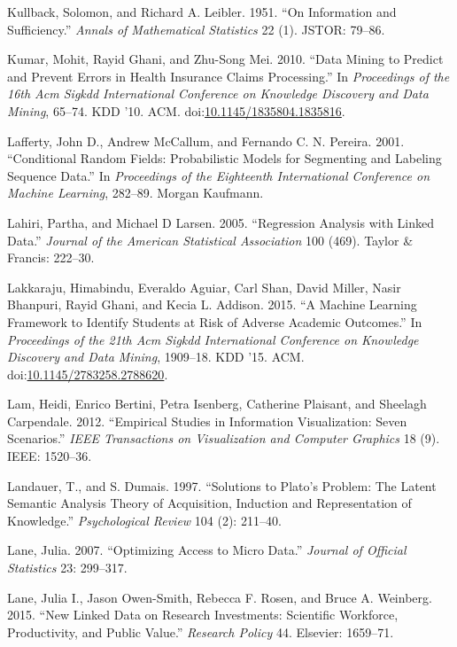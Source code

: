 \documentclass[]{krantz}
\begin{document}
\hypertarget{ref-kullback1951information}{}
Kullback, Solomon, and Richard A. Leibler. 1951. ``On Information and
Sufficiency.'' \emph{Annals of Mathematical Statistics} 22 (1). JSTOR:
79--86.

\hypertarget{ref-Kumar2010}{}
Kumar, Mohit, Rayid Ghani, and Zhu-Song Mei. 2010. ``Data Mining to
Predict and Prevent Errors in Health Insurance Claims Processing.'' In
\emph{Proceedings of the 16th Acm Sigkdd International Conference on
Knowledge Discovery and Data Mining}, 65--74. KDD '10. ACM.
doi:\href{https://doi.org/10.1145/1835804.1835816}{10.1145/1835804.1835816}.

\hypertarget{ref-lafferty-01}{}
Lafferty, John D., Andrew McCallum, and Fernando C. N. Pereira. 2001.
``Conditional Random Fields: Probabilistic Models for Segmenting and
Labeling Sequence Data.'' In \emph{Proceedings of the Eighteenth
International Conference on Machine Learning}, 282--89. Morgan Kaufmann.

\hypertarget{ref-lahiri2005regression}{}
Lahiri, Partha, and Michael D Larsen. 2005. ``Regression Analysis with
Linked Data.'' \emph{Journal of the American Statistical Association}
100 (469). Taylor \& Francis: 222--30.

\hypertarget{ref-Lakkaraju2015}{}
Lakkaraju, Himabindu, Everaldo Aguiar, Carl Shan, David Miller, Nasir
Bhanpuri, Rayid Ghani, and Kecia L. Addison. 2015. ``A Machine Learning
Framework to Identify Students at Risk of Adverse Academic Outcomes.''
In \emph{Proceedings of the 21th Acm Sigkdd International Conference on
Knowledge Discovery and Data Mining}, 1909--18. KDD '15. ACM.
doi:\href{https://doi.org/10.1145/2783258.2788620}{10.1145/2783258.2788620}.

\hypertarget{ref-lam2012empirical}{}
Lam, Heidi, Enrico Bertini, Petra Isenberg, Catherine Plaisant, and
Sheelagh Carpendale. 2012. ``Empirical Studies in Information
Visualization: Seven Scenarios.'' \emph{IEEE Transactions on
Visualization and Computer Graphics} 18 (9). IEEE: 1520--36.

\hypertarget{ref-landauer-97}{}
Landauer, T., and S. Dumais. 1997. ``Solutions to Plato's Problem: The
Latent Semantic Analysis Theory of Acquisition, Induction and
Representation of Knowledge.'' \emph{Psychological Review} 104 (2):
211--40.

\hypertarget{ref-Lane2007}{}
Lane, Julia. 2007. ``Optimizing Access to Micro Data.'' \emph{Journal of
Official Statistics} 23: 299--317.

\hypertarget{ref-lane2015new}{}
Lane, Julia I., Jason Owen-Smith, Rebecca F. Rosen, and Bruce A.
Weinberg. 2015. ``New Linked Data on Research Investments: Scientific
Workforce, Productivity, and Public Value.'' \emph{Research Policy} 44.
Elsevier: 1659--71.
\end{document}
